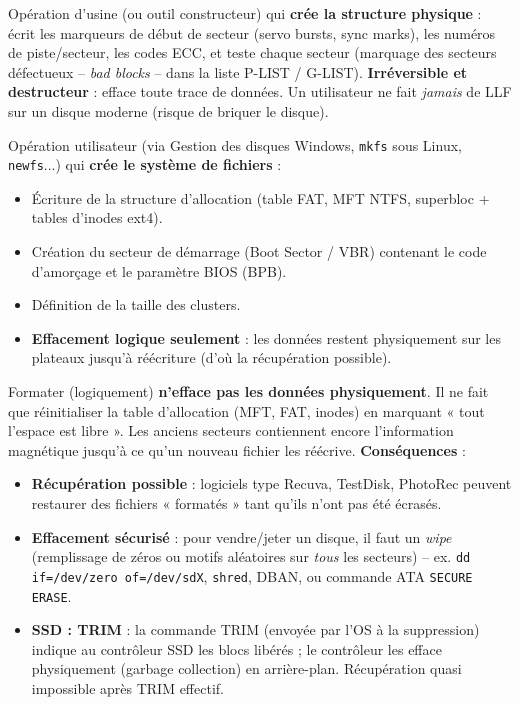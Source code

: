 \documentclass[11pt]{article}
\newcounter{popsec}
\newcounter{popsub}
\newcommand{\courssub}[1]{%
  \stepcounter{popsub}%
  \par\vspace{9pt}\noindent{\popxbold\fontsize{11.5}{13}\selectfont\color{popink}{\color{poporange}\thepopsec.\thepopsub}\hspace{6pt}#1}\par\nopagebreak\vspace{4pt}
}
\begin{document}
\courssub{Formatage : bas niveau et logique}

\begin{definition}
Opération d'usine (ou outil constructeur) qui \textbf{crée la structure physique} : écrit les marqueurs de début de secteur (servo bursts, sync marks), les numéros de piste/secteur, les codes ECC, et teste chaque secteur (marquage des secteurs défectueux -- \emph{bad blocks} -- dans la liste P-LIST / G-LIST). \textbf{Irréversible et destructeur} : efface toute trace de données. Un utilisateur ne fait \emph{jamais} de LLF sur un disque moderne (risque de briquer le disque).
\end{definition}

\begin{definition}
Opération utilisateur (via Gestion des disques Windows, \texttt{mkfs} sous Linux, \texttt{newfs}...) qui \textbf{crée le système de fichiers} :
\begin{itemize}
    \item Écriture de la structure d'allocation (table FAT, MFT NTFS, superbloc + tables d'inodes ext4).
    \item Création du secteur de démarrage (Boot Sector / VBR) contenant le code d'amorçage et le paramètre BIOS (BPB).
    \item Définition de la taille des clusters.
    \item \textbf{Effacement logique seulement} : les données restent physiquement sur les plateaux jusqu'à réécriture (d'où la récupération possible).
\end{itemize}
\end{definition}

\begin{attention}
Formater (logiquement) \textbf{n'efface pas les données physiquement}. Il ne fait que réinitialiser la table d'allocation (MFT, FAT, inodes) en marquant « tout l'espace est libre ». Les anciens secteurs contiennent encore l'information magnétique jusqu'à ce qu'un nouveau fichier les réécrive. \textbf{Conséquences} :
\begin{itemize}
    \item \textbf{Récupération possible} : logiciels type Recuva, TestDisk, PhotoRec peuvent restaurer des fichiers « formatés » tant qu'ils n'ont pas été écrasés.
    \item \textbf{Effacement sécurisé} : pour vendre/jeter un disque, il faut un \emph{wipe} (remplissage de zéros ou motifs aléatoires sur \emph{tous} les secteurs) -- ex. \texttt{dd if=/dev/zero of=/dev/sdX}, \texttt{shred}, DBAN, ou commande ATA \texttt{SECURE ERASE}.
    \item \textbf{SSD : TRIM} : la commande TRIM (envoyée par l'OS à la suppression) indique au contrôleur SSD les blocs libérés ; le contrôleur les efface physiquement (garbage collection) en arrière-plan. Récupération quasi impossible après TRIM effectif.
\end{itemize}
\end{attention}
\end{document}
